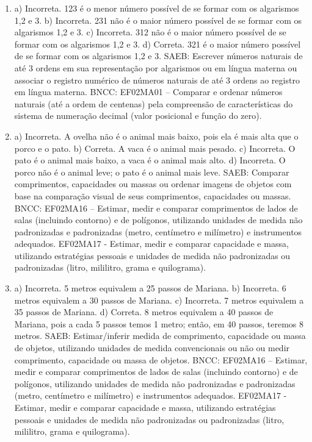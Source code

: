 \begin{enumerate}
\item
a) Incorreta. 123 é o menor número possível de se formar com os algarismos 1,2 e 3.
b) Incorreta. 231 não é o maior número possível de se formar com os algarismos 1,2 e 3.
c) Incorreta. 312 não é o maior número possível de se  formar com os algarismos 1,2 e 3.
d) Correta. 321 é o maior número possível de se formar com os algarismos 1,2 e 3.
SAEB: Escrever números naturais de até 3 ordens em sua
representação por algarismos ou em língua materna ou associar o registro
numérico de números naturais de até 3 ordens ao registro em língua
materna.
BNCC: EF02MA01 -- Comparar e ordenar números naturais (até a ordem de
centenas) pela compreensão de características do sistema de numeração
decimal (valor posicional e função do zero).

\item
a) Incorreta. A ovelha não é o animal mais baixo, pois ela é mais alta
que o porco e o pato.
b) Correta. A vaca é o animal mais pesado.
c) Incorreta. O pato é o animal mais baixo, a vaca é o animal mais alto.
d) Incorreta. O porco não é o animal leve; o pato é o animal mais leve.
SAEB: Comparar comprimentos, capacidades ou massas ou ordenar
imagens de objetos com base na comparação visual de seus comprimentos,
capacidades ou massas.
BNCC: EF02MA16 -- Estimar, medir e comparar comprimentos de lados de
salas (incluindo contorno) e de polígonos, utilizando unidades de medida
não padronizadas e padronizadas (metro, centímetro e milímetro) e
instrumentos adequados. EF02MA17 - Estimar, medir e comparar capacidade
e massa, utilizando estratégias pessoais e unidades de medida não
padronizadas ou padronizadas (litro, mililitro, grama e quilograma).

\item
a) Incorreta. 5 metros equivalem a 25 passos de Mariana.
b) Incorreta. 6 metros equivalem a 30 passos de Mariana.
c) Incorreta. 7 metros equivalem a 35 passos de Mariana.
d) Correta. 8 metros equivalem a 40 passos de Mariana, pois a cada 5 passos temos 1 metro; então, em 40 passos, teremos 8 metros.
SAEB: Estimar/inferir medida de comprimento, capacidade ou massa
de objetos, utilizando unidades de medida convencionais ou não ou medir
comprimento, capacidade ou massa de objetos.
BNCC: EF02MA16 -- Estimar, medir e comparar comprimentos de lados de
salas (incluindo contorno) e de polígonos, utilizando unidades de medida
não padronizadas e padronizadas (metro, centímetro e milímetro) e
instrumentos adequados. EF02MA17 - Estimar, medir e comparar capacidade
e massa, utilizando estratégias pessoais e unidades de medida não
padronizadas ou padronizadas (litro, mililitro, grama e quilograma).


\end{enumerate}
